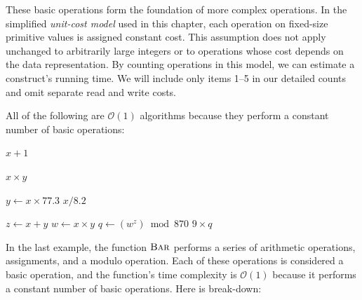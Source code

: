 These basic operations form the foundation of more complex operations. In the simplified \emph{unit-cost model} used in this chapter, each operation on fixed-size primitive values is assigned constant cost. This assumption does not apply unchanged to arbitrarily large integers or to operations whose cost depends on the data representation. By counting operations in this model, we can estimate a construct's running time. We will include only items 1--5 in our detailed counts and omit separate read and write costs.

All of the following are $\mathcal{O}(1)$ algorithms because they perform a constant number of basic operations:

\begin{codebox}
    \li \Return $x + 1$
\end{codebox}

\begin{codebox}
    \li \Return $x \times y$
\end{codebox}

\begin{codebox}
    \li $y \gets x \times 77.3$
    \li \Return $x / 8.2$
\end{codebox}

\begin{codebox}
    \li $z \gets x + y$
    \li $w \gets x \times y$
    \li $q \gets (w^z) \bmod 870$
    \li \Return $9 \times q$
\end{codebox}

In the last example, the function $\proc{Bar}$ performs a series of arithmetic operations, assignments, and a modulo operation. Each of these operations is considered a basic operation, and the function's time complexity is $\mathcal{O}(1)$ because it performs a constant number of basic operations. Here is break-down:

